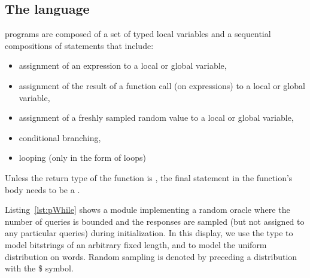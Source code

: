 \subsection{The \pWHILE language}
\pWHILE programs are composed of a set of typed local variables and a
sequential compositions of statements that include:
\begin{itemize}\itemsep-.5em
\item assignment of an expression to a local or global variable,
\item assignment of the result of a function call (on expressions) to a local
  or global variable,
\item assignment of a freshly sampled random value to a local or global
  variable,
\item conditional branching,
\item looping (only in the form of  loops)
\end{itemize}
Unless the return type of the function is , the final statement in
the function's body needs to be a .

Listing~\ref{lst:pWhile} shows a module implementing a random oracle where the
number of queries is bounded and the responses are sampled (but not assigned to
any particular queries) during initialization. In this display, we use the type
 to model bitstrings of an arbitrary fixed length, and
 to model the uniform distribution on words. Random sampling is
denoted by preceding a distribution with the \textsf{\$} symbol.



